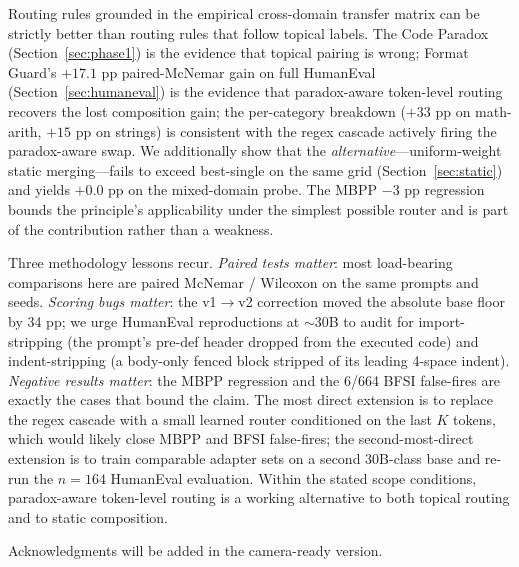 \documentclass{article}
\begin{document}
Routing rules grounded in the empirical cross-domain transfer matrix can be strictly better than routing rules that follow topical labels. The Code Paradox (Section~\ref{sec:phase1}) is the evidence that topical pairing is wrong; Format Guard's $+17.1$ pp paired-McNemar gain on full HumanEval (Section~\ref{sec:humaneval}) is the evidence that paradox-aware token-level routing recovers the lost composition gain; the per-category breakdown ($+33$ pp on math-arith, $+15$ pp on strings) is consistent with the regex cascade actively firing the paradox-aware swap. We additionally show that the \emph{alternative}---uniform-weight static merging---fails to exceed best-single on the same grid (Section~\ref{sec:static}) and yields $+0.0$ pp on the mixed-domain probe. The MBPP $-3$ pp regression bounds the principle's applicability under the simplest possible router and is part of the contribution rather than a weakness.

Three methodology lessons recur. \emph{Paired tests matter}: most load-bearing comparisons here are paired McNemar / Wilcoxon on the same prompts and seeds. \emph{Scoring bugs matter}: the v1$\rightarrow$v2 correction moved the absolute base floor by 34 pp; we urge HumanEval reproductions at $\sim 30$B to audit for import-stripping (the prompt's pre-def header dropped from the executed code) and indent-stripping (a body-only fenced block stripped of its leading 4-space indent). \emph{Negative results matter}: the MBPP regression and the 6/664 BFSI false-fires are exactly the cases that bound the claim. The most direct extension is to replace the regex cascade with a small learned router conditioned on the last $K$ tokens, which would likely close MBPP and BFSI false-fires; the second-most-direct extension is to train comparable adapter sets on a second 30B-class base and re-run the $n=164$ HumanEval evaluation. Within the stated scope conditions, paradox-aware token-level routing is a working alternative to both topical routing and to static composition.

\begin{ack}
Acknowledgments will be added in the camera-ready version.
\end{ack}
\end{document}
